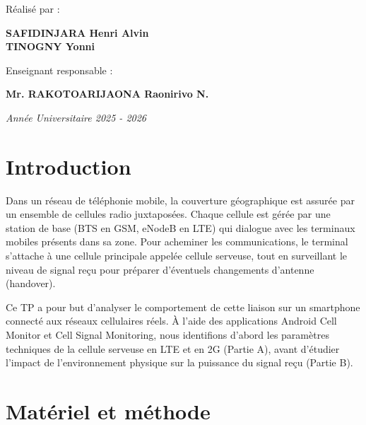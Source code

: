 \documentclass[11pt,a4paper]{article}
\begin{document}
\begin{titlepage}
{\small R\'ealis\'e par :}

\vspace{0.3cm}

{\normalsize\bfseries SAFIDINJARA Henri Alvin}\\[4pt]
{\normalsize\bfseries TINOGNY Yonni}

\vspace{1.2cm}

{\small Enseignant responsable :}

\vspace{0.3cm}

{\normalsize\bfseries Mr. RAKOTOARIJAONA Raonirivo N.}

\vfill

{\itshape Ann\'ee Universitaire 2025 - 2026}

\vspace{0.3cm}
\end{titlepage}

\tableofcontents
\newpage

\section{Introduction}

Dans un r\'eseau de t\'el\'ephonie mobile, la couverture g\'eographique est assur\'ee par un ensemble de cellules radio juxtapos\'ees. Chaque cellule est g\'er\'ee par une station de base (BTS en GSM, eNodeB en LTE) qui dialogue avec les terminaux mobiles pr\'esents dans sa zone. Pour acheminer les communications, le terminal s'attache \`a une cellule principale appel\'ee cellule serveuse, tout en surveillant le niveau de signal re\c{c}u pour pr\'eparer d'\'eventuels changements d'antenne (handover).

Ce TP a pour but d'analyser le comportement de cette liaison sur un smartphone connect\'e aux r\'eseaux cellulaires r\'eels. \`A l'aide des applications Android Cell Monitor et Cell Signal Monitoring, nous identifions d'abord les param\`etres techniques de la cellule serveuse en LTE et en 2G (Partie A), avant d'\'etudier l'impact de l'environnement physique sur la puissance du signal re\c{c}u (Partie B).

\section{Mat\'eriel et m\'ethode}
\end{document}
